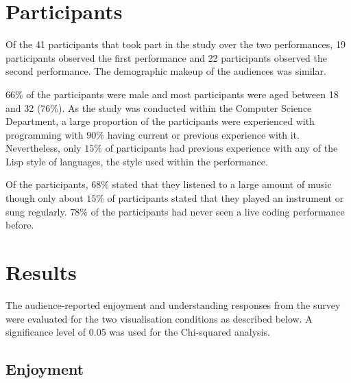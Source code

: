 \section{Participants}

Of the 41 participants that took part in the study over the two performances, 19 participants observed the first performance and 22 participants observed the second performance. The demographic makeup of the audiences was similar.

$66\%$ of the participants were male and most participants were aged between 18 and 32 ($76\%$). As the study was conducted within the Computer Science Department, a large proportion of the participants were experienced with programming with $90\%$ having current or previous experience with it. Nevertheless, only $15\%$ of participants had previous experience with any of the Lisp style of languages, the style used within the performance.

Of the participants, $68\%$ stated that they listened to a large amount of music though only about $15\%$ of participants stated that they played an instrument or sung regularly. $78\%$ of the participants had never seen a live coding performance before.

\section{Results}

The audience-reported enjoyment and understanding responses from the survey were evaluated for the two visualisation conditions as described below. A significance level of $0.05$ was used for the Chi-squared analysis.

\subsection{Enjoyment}

